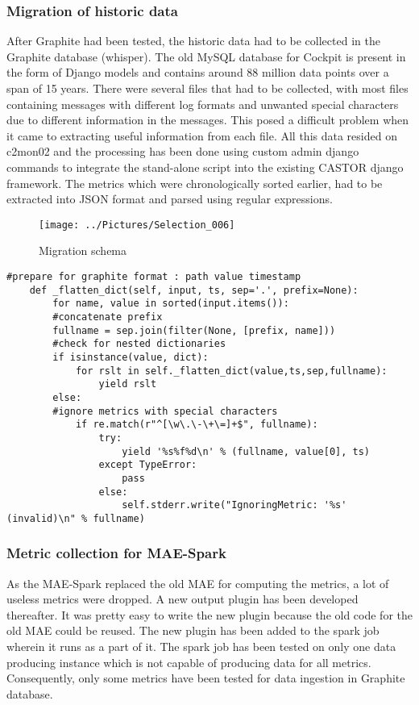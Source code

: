 \documentclass[11pt, letterpaper]{article}            %
\begin{document}
\subsubsection{Migration of historic data}
After Graphite had been tested, the historic data had to be collected in the Graphite database (whisper). The old MySQL database for Cockpit is present in the form of Django models and contains around 88  million data points over a span of 15 years. There were several files that had to be collected, with most files containing messages with different log formats and unwanted special characters due to different information in the messages. This posed a difficult problem when it came to extracting useful information from each file. All this data resided on c2mon02 and the processing has been done using custom admin django commands to integrate the stand-alone script into the existing CASTOR django framework. The metrics which were chronologically sorted earlier, had to be extracted into JSON format and parsed using regular expressions.\citep{django}
\begin{figure}[h]
	\centering

	\texttt{[image: ../Pictures/Selection\_006]}
		\caption{Migration schema}
\end{figure}
\bigskip
\bigskip
\bigskip
\bigskip
\bigskip
\bigskip
\bigskip
\bigskip
\bigskip
\bigskip
\bigskip
\bigskip

\begin{lstlisting}[frame=single, caption= Metric data parsing]
    #prepare for graphite format : path value timestamp
    def _flatten_dict(self, input, ts, sep='.', prefix=None):
        for name, value in sorted(input.items()):
        #concatenate prefix
        fullname = sep.join(filter(None, [prefix, name]))
        #check for nested dictionaries
        if isinstance(value, dict):
            for rslt in self._flatten_dict(value,ts,sep,fullname):
                yield rslt
        else:
        #ignore metrics with special characters
            if re.match(r"^[\w\.\-\+\=]+$", fullname):
                try:
                    yield '%s%f%d\n' % (fullname, value[0], ts)
                except TypeError:
                    pass
                else:
                    self.stderr.write("IgnoringMetric: '%s' (invalid)\n" % fullname)

\end{lstlisting}

\subsubsection{Metric collection for MAE-Spark}
As the MAE-Spark replaced the old MAE for computing the metrics, a lot of useless metrics were dropped. A new output plugin has been developed thereafter. It was pretty easy to write the new plugin because the old code for the old MAE could be reused. The new plugin has been added to the spark job wherein it runs as a part of it. The spark job has been tested on only one data producing instance which is not capable of producing data for all metrics. Consequently, only some metrics have been tested for data ingestion in Graphite database. 
\end{document}
